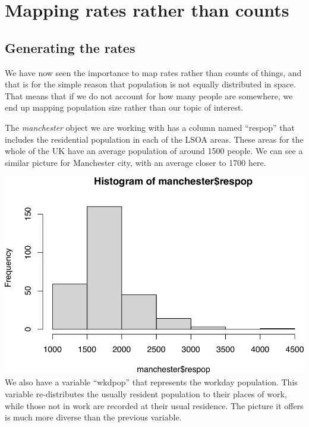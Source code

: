 \documentclass[
  krantz2]{krantz}
\makeatletter
\newenvironment{Shaded}{\begin{snugshade}}{\end{snugshade}}
\newcommand{\FunctionTok}[1]{\textcolor[rgb]{0,0,0}{#1}}
\newcommand{\NormalTok}[1]{#1}
\newcommand{\SpecialCharTok}[1]{\textcolor[rgb]{0,0,0}{#1}}
\newenvironment{kframe}{%
\medskip{}
\setlength{\fboxsep}{.8em}
 \def\at@end@of@kframe{}%
 \ifinner\ifhmode%
  \def\at@end@of@kframe{\end{minipage}}%
  \begin{minipage}{\columnwidth}%
 \fi\fi%
 \def\FrameCommand##1{\hskip\@totalleftmargin \hskip-\fboxsep
 \colorbox{shadecolor}{##1}\hskip-\fboxsep
     \hskip-\linewidth \hskip-\@totalleftmargin \hskip\columnwidth}%
 \MakeFramed {\advance\hsize-\width
   \@totalleftmargin\z@ \linewidth\hsize
   \@setminipage}}%
 {\par\unskip\endMakeFramed%
 \at@end@of@kframe}
\renewenvironment{Shaded}{\begin{kframe}}{\end{kframe}}
\makeatother
\begin{document}
\hypertarget{mapping-rates-rather-than-counts}{%
\section{Mapping rates rather than counts}\label{mapping-rates-rather-than-counts}}

\hypertarget{generating-the-rates}{%
\subsection{Generating the rates}\label{generating-the-rates}}

We have now seen the importance to map rates rather than counts of things, and that is for the simple reason that population is not equally distributed in space. That means that if we do not account for how many people are somewhere, we end up mapping population size rather than our topic of interest.

The \emph{manchester} object we are working with has a column named ``respop'' that includes the residential population in each of the LSOA areas. These areas for the whole of the UK have an average population of around 1500 people. We can see a similar picture for Manchester city, with an average closer to 1700 here.

\begin{Shaded}
\end{Shaded}

\includegraphics{crime_mapping_files/figure-latex/unnamed-chunk-81-1.pdf}
We also have a variable ``wkdpop'' that represents the workday population. This variable re-distributes the usually resident population to their places of work, while those not in work are recorded at their usual residence. The picture it offers is much more diverse than the previous variable.
\end{document}
